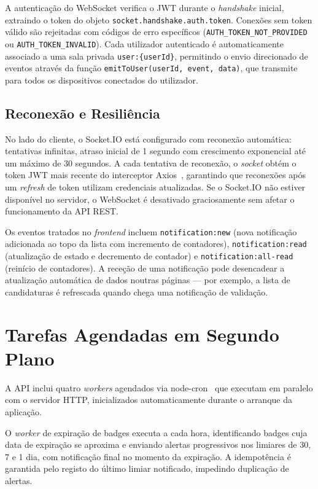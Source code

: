 \documentclass[12pt,a4paper]{report}
\begin{document}
A autenticação do WebSocket verifica o JWT durante o \textit{handshake} inicial, extraindo o token do objeto \texttt{socket.handshake.auth.token}. Conexões sem token válido são rejeitadas com códigos de erro específicos (\texttt{AUTH\_TOKEN\_NOT\_PROVIDED} ou \texttt{AUTH\_TOKEN\_INVALID}). Cada utilizador autenticado é automaticamente associado a uma sala privada \texttt{user:\{userId\}}, permitindo o envio direcionado de eventos através da função \texttt{emitToUser(userId, event, data)}, que transmite para todos os dispositivos conectados do utilizador.

\subsection{Reconexão e Resiliência}

No lado do cliente, o Socket.IO está configurado com reconexão automática: tentativas infinitas, atraso inicial de 1 segundo com crescimento exponencial até um máximo de 30 segundos. A cada tentativa de reconexão, o \textit{socket} obtém o token JWT mais recente do interceptor Axios~\cite{axios}, garantindo que reconexões após um \textit{refresh} de token utilizam credenciais atualizadas. Se o Socket.IO não estiver disponível no servidor, o WebSocket é desativado graciosamente sem afetar o funcionamento da API REST.

Os eventos tratados no \textit{frontend} incluem \texttt{notification:new} (nova notificação adicionada ao topo da lista com incremento de contadores), \texttt{notification:read} (atualização de estado e decremento de contador) e \texttt{notification:all-read} (reinício de contadores). A receção de uma notificação pode desencadear a atualização automática de dados noutras páginas --- por exemplo, a lista de candidaturas é refrescada quando chega uma notificação de validação.

\section{Tarefas Agendadas em Segundo Plano}

A API inclui quatro \textit{workers} agendados via node-cron~\cite{nodecron} que executam em paralelo com o servidor HTTP, inicializados automaticamente durante o arranque da aplicação.

O \textit{worker} de expiração de badges executa a cada hora, identificando badges cuja data de expiração se aproxima e enviando alertas progressivos nos limiares de 30, 7 e 1 dia, com notificação final no momento da expiração. A idempotência é garantida pelo registo do último limiar notificado, impedindo duplicação de alertas.
\end{document}
